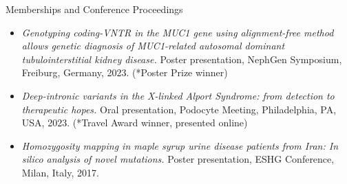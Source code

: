 \documentclass[
	11pt, %
]{resume} %
\begin{document}
\begin{rSection}{Memberships and Conference Proceedings}
\begin{itemize}
  \item \textit{Genotyping coding-VNTR in the MUC1 gene using alignment-free method allows genetic diagnosis of MUC1-related autosomal dominant tubulointerstitial kidney disease.} Poster presentation, NephGen Symposium, Freiburg, Germany, 2023. (*Poster Prize winner)
  \item \textit{Deep-intronic variants in the X-linked Alport Syndrome: from detection to therapeutic hopes.} Oral presentation, Podocyte Meeting, Philadelphia, PA, USA, 2023. (*Travel Award winner, presented online)
  \item \textit{Homozygosity mapping in maple syrup urine disease patients from Iran: In silico analysis of novel mutations.} Poster presentation, ESHG Conference, Milan, Italy, 2017.
\end{itemize}
\end{rSection}

\end{document}
